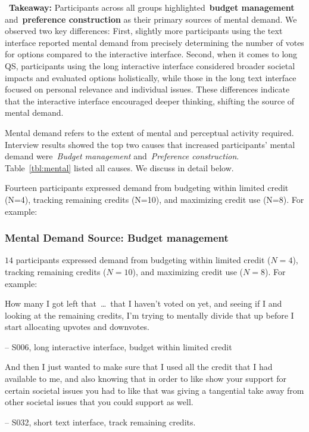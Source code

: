 \vspace{5pt}
\begin{tldrbox}
    \faInfoCircle~\xspace\textbf{Takeaway:} Participants across all groups highlighted~\textbf{budget management} and~\textbf{preference construction} as their primary sources of mental demand. We observed two key differences: First, slightly more participants using the text interface reported mental demand from precisely determining the number of votes for options compared to the interactive interface. Second, when it comes to long QS, participants using the long interactive interface considered broader societal impacts and evaluated options holistically, while those in the long text interface focused on personal relevance and individual issues. These differences indicate that the interactive interface encouraged deeper thinking, shifting the source of mental demand. %
\end{tldrbox}

Mental demand refers to the extent of mental and perceptual activity required. Interview results showed the top two causes that increased participants' mental demand were~\textit{Budget management} and~\textit{Preference construction}. Table~\ref{tbl:mental} listed all causes. We discuss in detail below.

Fourteen participants expressed demand from budgeting within limited credit (N=4), tracking remaining credits (N=10), and maximizing credit use (N=8). For example:

\subsubsection{Mental Demand Source: Budget management} $14$ participants expressed demand from budgeting within limited credit ($N=4$), tracking remaining credits ($N=10$), and maximizing credit use ($N=8$). For example:

\begin{displayquote}
How many I got left that~\ldots\ that I haven't voted on yet, and seeing if I and looking at the remaining credits, I'm trying to mentally divide that up before I start allocating upvotes and downvotes.

\small{\noindent \hfill -- S006, long interactive interface, budget within limited credit}
\end{displayquote}

\begin{displayquote}
And then I just wanted to make sure that I used all the credit that I had available to me, and also knowing that in order to like show your support for certain societal issues you had to like that was giving a tangential take away from other societal issues that you could support as well.
    
\noindent \hfill -- S032, short text interface, track remaining credits.
\end{displayquote}


